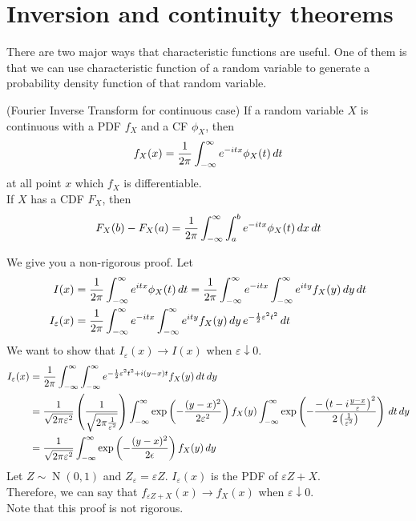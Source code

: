 \documentclass{huhtakm-template-book}
\DeclareMathOperator{\N}{N}
\begin{document}
\section{Inversion and continuity theorems}
There are two major ways that characteristic functions are useful. One of them is that we can use characteristic function of a random variable to generate a probability density function of that random variable.
\begin{thm}(Fourier Inverse Transform for continuous case)
	If a random variable $X$ is continuous with a PDF $f_{X}$ and a CF $\phi_{X}$, then
	\begin{equation*}
		f_{X}(x)=\frac{1}{2\pi}\int_{-\infty}^{\infty} e^{-itx}\phi_{X}(t)\,dt
	\end{equation*}
	at all point $x$ which $f_{X}$ is differentiable.\\
	If $X$ has a CDF $F_{X}$, then
	\begin{equation*}
		F_{X}(b)-F_{X}(a)=\frac{1}{2\pi}\int_{-\infty}^{\infty}\int_{a}^{b}e^{-itx}\phi_{X}(t)\,dx\,dt
	\end{equation*}
\end{thm}
\begin{proofing}
	We give you a non-rigorous proof. Let
	\begin{align*}
		I(x)&=\frac{1}{2\pi}\int_{-\infty}^{\infty} e^{itx}\phi_{X}(t)\,dt=\frac{1}{2\pi}\int_{-\infty}^{\infty} e^{-itx}\int_{-\infty}^{\infty} e^{ity}f_{X}(y)\,dy\,dt\\
		I_{\varepsilon}(x)&=\frac{1}{2\pi}\int_{-\infty}^{\infty} e^{-itx}\int_{-\infty}^{\infty} e^{ity}f_{X}(y)\,dy\,e^{-\frac{1}{2}\varepsilon^{2}t^{2}}\,dt
	\end{align*}
	We want to show that $I_{\varepsilon}(x)\to I(x)$ when $\varepsilon\downarrow 0$.
	\begin{align*}
		I_{\varepsilon}(x)&=\frac{1}{2\pi}\int_{-\infty}^{\infty}\int_{-\infty}^{\infty} e^{-\frac{1}{2}\varepsilon^{2}t^{2}+i(y-x)t}f_{X}(y)\,dt\,dy\\
		&=\frac{1}{\sqrt{2\pi\varepsilon^{2}}}\left(\frac{1}{\sqrt{2\pi\frac{1}{\varepsilon^{2}}}}\right)\int_{-\infty}^{\infty}\exp\left(-\frac{(y-x)^{2}}{2\varepsilon^{2}}\right)f_{X}(y)\int_{-\infty}^{\infty}\exp\left(-\frac{-\left(t-i\frac{y-x}{\varepsilon}\right)^{2}}{2\left(\frac{1}{\varepsilon^{2}}\right)}\right)\,dt\,dy\\
		&=\frac{1}{\sqrt{2\pi\varepsilon^{2}}}\int_{-\infty}^{\infty}\exp\left(-\frac{(y-x)^{2}}{2\epsilon}\right)f_{X}(y)\,dy
	\end{align*}
	Let $Z\sim\N(0,1)$ and $Z_{\varepsilon}=\varepsilon Z$. $I_{\varepsilon}(x)$ is the PDF of $\varepsilon Z+X$.\\
	Therefore, we can say that $f_{\varepsilon Z+X}(x)\to f_{X}(x)$ when $\varepsilon\downarrow 0$.\\
	Note that this proof is not rigorous.
\end{proofing}
\end{document}
